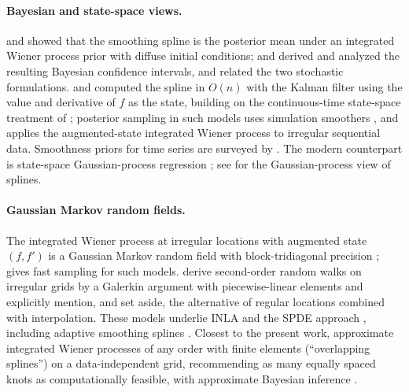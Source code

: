 \documentclass[11pt,a4paper]{article}
\theoremstyle{definition}
\theoremstyle{remark}
\begin{document}
\paragraph{Bayesian and state-space views.} \citet{KimeldorfWahba1970} and \citet{Wahba1978} showed that the smoothing spline is the posterior mean under an integrated Wiener process prior with diffuse initial conditions; \citet{Wahba1983} and \citet{Nychka1988} derived and analyzed the resulting Bayesian confidence intervals, and \citet{AnsleyKohn1986} related the two stochastic formulations. \citet{WeckerAnsley1983} and \citet{KohnAnsley1987} computed the spline in $O(n)$ with the Kalman filter using the value and derivative of $f$ as the state, building on the continuous-time state-space treatment of \citet{Jones1981}; posterior sampling in such models uses simulation smoothers \citep{CarterKohn1994,DurbinKoopman2002}, and \citet{Robinson2010} applies the augmented-state integrated Wiener process to irregular sequential data. Smoothness priors for time series are surveyed by \citet{KitagawaGersch1996}. The modern counterpart is state-space Gaussian-process regression \citep{HartikainenSarkka2010,SarkkaSolinHartikainen2013,SarkkaSolin2019,SolinSarkka2020}; see \citet{RasmussenWilliams2006} for the Gaussian-process view of splines.

\paragraph{Gaussian Markov random fields.} The integrated Wiener process at irregular locations with augmented state $(f,f')$ is a Gaussian Markov random field with block-tridiagonal precision \citep{RueHeld2005,LindgrenRue2008}; \citet{Rue2001} gives fast sampling for such models. \citet{LindgrenRue2008} derive second-order random walks on irregular grids by a Galerkin argument with piecewise-linear elements and explicitly mention, and set aside, the alternative of regular locations combined with interpolation. These models underlie INLA \citep{RueMartinoChopin2009} and the SPDE approach \citep{LindgrenRueLindstrom2011,LindgrenBolinRue2022}, including adaptive smoothing splines \citep{YueSimpsonLindgrenRue2014}. Closest to the present work, \citet{ZhangStringerBrownStafford2024} approximate integrated Wiener processes of any order with finite elements (``overlapping splines'') on a data-independent grid, recommending as many equally spaced knots as computationally feasible, with approximate Bayesian inference \citep{StringerBrownStafford2023}.
\end{document}
